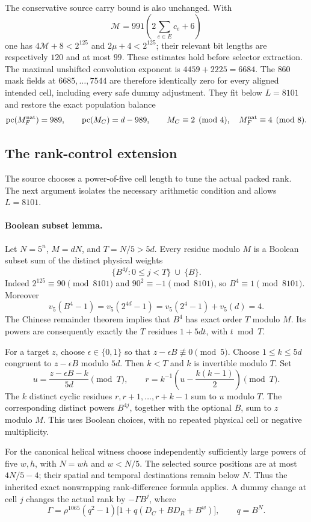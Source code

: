 The conservative source carry bound is also unchanged.  With
\[
 \mathcal M=991\left(2\sum_{e\in E}c_e+6\right)
\]
one has $4\mathcal M+8<2^{125}$ and $2\mu+4<2^{125}$; their relevant
bit lengths are respectively $120$ and at most $99$.  These estimates hold
before selector extraction.  The maximal unshifted convolution exponent
is $4459+2225=6684$.  The $860$ mask fields at $6685,\ldots,7544$ are
therefore identically zero for every aligned intended cell, including every
safe dummy adjustment.  They fit below $L=8101$ and restore the exact
population balance
\[
 \operatorname{pc}(M_F^{\rm nat})=989,\qquad
 \operatorname{pc}(M_C)=d-989,\qquad
 M_C\equiv2\pmod4,\quad M_F^{\rm nat}\equiv4\pmod8.
\]

\subsection{The rank-control extension}

The source chooses a power-of-five cell length to tune the actual packed
rank.  The next argument isolates the necessary arithmetic condition and
allows $L=8101$.

\paragraph{Boolean subset lemma.}
Let $N=5^n$, $M=dN$, and $T=N/5>5d$.  Every residue modulo $M$ is a
Boolean subset sum of the distinct physical weights
\[
 \{B^{4j}:0\le j<T\}\ \cup\ \{B\}.
\]
Indeed $2^{125}\equiv90\pmod{8101}$ and $90^2\equiv-1\pmod{8101}$,
so $B^4\equiv1\pmod{8101}$.  Moreover
\[
 v_5(B^4-1)=v_5(2^{4d}-1)=v_5(2^4-1)+v_5(d)=4.
\]
The Chinese remainder theorem implies that $B^4$ has exact order $T$
modulo $M$.  Its powers are consequently exactly the $T$ residues
$1+5d t$, with $t\bmod T$.

For a target $z$, choose $\epsilon\in\{0,1\}$ so that
$z-\epsilon B\not\equiv0\pmod5$.  Choose $1\le k\le5d$ congruent
to $z-\epsilon B$ modulo $5d$.  Then $k<T$ and $k$ is invertible
modulo $T$.  Set
\[
 u=\frac{z-\epsilon B-k}{5d}\pmod T,\qquad
 r=k^{-1}\left(u-\frac{k(k-1)}2\right)\pmod T.
\]
The $k$ distinct cyclic residues $r,r+1,\ldots,r+k-1$ sum to $u$ modulo
$T$.  The corresponding distinct powers $B^{4j}$, together with the
optional $B$, sum to $z$ modulo $M$.  This uses Boolean choices, with
no repeated physical cell or negative multiplicity.

For the canonical helical witness choose independently sufficiently large
powers of five $w,h$, with $N=wh$ and $w<N/5$.  The selected source
positions are at most $4N/5-4$; their spatial and temporal destinations
remain below $N$.  Thus the inherited exact nonwrapping rank-difference
formula applies.  A dummy change at cell $j$ changes the actual rank by
$-\Gamma B^j$, where
\[
 \Gamma=\rho^{1065}(q^2-1)
        \bigl[1+q(D_C+BD_R+B^w)\bigr],\qquad q=B^N.
\]

